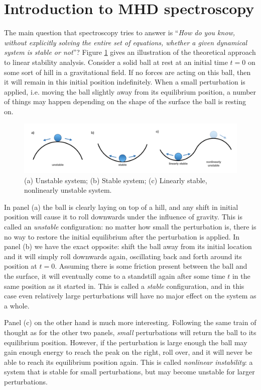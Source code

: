 \section{Introduction to MHD spectroscopy}
The main question that spectroscopy tries to answer is ``\emph{How do you know, without explicitly solving the entire set of equations, whether a given dynamical system is stable or not}''? Figure \ref{fig: stability} gives an illustration of the theoretical approach to linear stability analysis. Consider a solid ball at rest at an initial time $t = 0$ on some sort of hill in a gravitational field. If no forces are acting on this ball, then it will remain in this initial position indefinitely. When a small perturbation is applied, i.e. moving the ball slightly away from its equilibrium position, a number of things may happen depending on the shape of the surface the ball is resting on.

\begin{figure}[b]
  \centering
  \includegraphics[width=\textwidth]{stability.png}
  \caption{(a) Unstable system; (b) Stable system; (c) Linearly stable, nonlinearly unstable system.}
  \label{fig: stability}
\end{figure}

In panel (a) the ball is clearly laying on top of a hill, and any shift in initial position will cause it to roll downwards under the influence of gravity. This is called an \emph{unstable} configuration: no matter how small the perturbation is, there is no way to restore the initial equilibrium after the perturbation is applied.
In panel (b) we have the exact opposite: shift the ball away from its initial location and it will simply roll downwards again, oscillating back and forth around its position at $t = 0$. Assuming there is some friction present between the ball and the surface, it will eventually come to a standstill again after some time $t$ in the same position as it started in. This is called a \emph{stable} configuration, and in this case even relatively large perturbations will have no major effect on the system as a whole.

Panel (c) on the other hand is much more interesting. Following the same train of thought as for the other two panels, \emph{small} perturbations will return the ball to its equilibrium position. However, if the perturbation is large enough the ball may gain enough energy to reach the peak on the right, roll over, and it will never be able to reach its equilibrium position again. This is called \emph{nonlinear instability}: a system that is stable for small perturbations, but may become unstable for larger perturbations.


